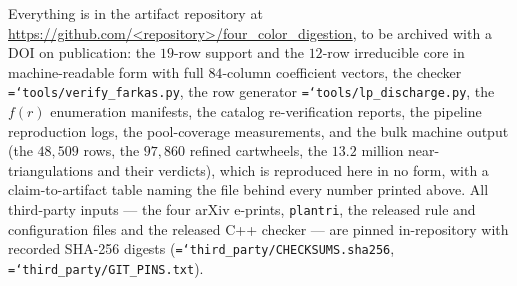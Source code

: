 \documentclass[11pt]{article}
\theoremstyle{definition}
\newcommand{\art}[1]{{\texttt{\hyphenchar\font=`\-\relax #1}}}
\begin{document}
Everything is in the artifact repository at
\url{https://github.com/<repository>/four_color_digestion}, to be archived with a
DOI on publication: the $19$-row support and the $12$-row irreducible core in
machine-readable form with full $84$-column coefficient vectors, the checker
\art{tools/verify\_farkas.py}, the row generator \art{tools/lp\_discharge.py},
the $f(r)$ enumeration manifests, the catalog re-verification reports, the
pipeline reproduction logs, the pool-coverage measurements, and the bulk machine
output (the $48{,}509$ rows, the $97{,}860$ refined cartwheels, the $13.2$
million near-triangulations and their verdicts), which is reproduced here in no
form, with a claim-to-artifact table naming the file behind every number printed
above. All third-party inputs --- the four arXiv e-prints, \texttt{plantri}, the
released rule and configuration files and the released C++ checker --- are pinned
in-repository with recorded SHA-256 digests
(\art{third\_party/CHECKSUMS.sha256}, \art{third\_party/GIT\_PINS.txt}).



\end{document}
